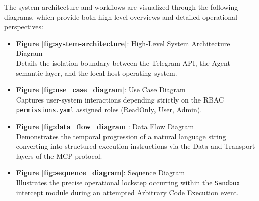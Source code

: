 \documentclass{scrreprt}
\begin{document}
The system architecture and workflows are visualized through the following diagrams, which provide both high-level overviews and detailed operational perspectives:

\begin{itemize}
    \item \textbf{Figure \ref{fig:system-architecture}}: High-Level System Architecture Diagram \\
    Details the isolation boundary between the Telegram API, the Agent semantic layer, and the local host operating system.

    \item \textbf{Figure \ref{fig:use_case_diagram}}: Use Case Diagram \\
    Captures user-system interactions depending strictly on the RBAC \texttt{permissions.yaml} assigned roles (ReadOnly, User, Admin).

    \item \textbf{Figure \ref{fig:data_flow_diagram}}: Data Flow Diagram \\
    Demonstrates the temporal progression of a natural language string converting into structured execution instructions via the Data and Transport layers of the MCP protocol.

    \item \textbf{Figure \ref{fig:sequence_diagram}}: Sequence Diagram \\
    Illustrates the precise operational lockstep occurring within the \texttt{Sandbox} intercept module during an attempted Arbitrary Code Execution event.
\end{itemize}
\end{document}
